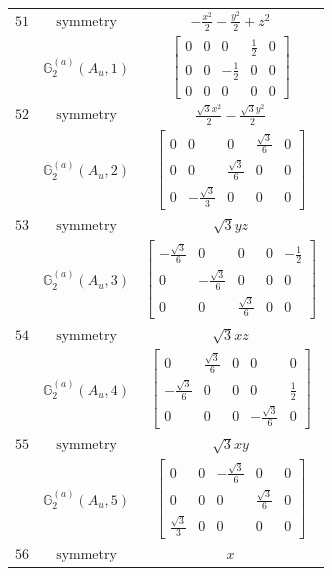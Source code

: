 \documentclass[fleqn,8pt,landscape]{jsarticle}
\begin{document}
\begin{longtable}{ccc}
$ 51 $ & $ \text{symmetry} $ & $ - \frac{x^{2}}{2} - \frac{y^{2}}{2} + z^{2} $ \\
$  $ & $ \mathbb{G}_{2}^{(a)}(A_{u},1) $ & $ \begin{bmatrix} 0 & 0 & 0 & \frac{1}{2} & 0 \\ 0 & 0 & - \frac{1}{2} & 0 & 0 \\ 0 & 0 & 0 & 0 & 0 \end{bmatrix} $ \\ \hline
$ 52 $ & $ \text{symmetry} $ & $ \frac{\sqrt{3} x^{2}}{2} - \frac{\sqrt{3} y^{2}}{2} $ \\
$  $ & $ \mathbb{G}_{2}^{(a)}(A_{u},2) $ & $ \begin{bmatrix} 0 & 0 & 0 & \frac{\sqrt{3}}{6} & 0 \\ 0 & 0 & \frac{\sqrt{3}}{6} & 0 & 0 \\ 0 & - \frac{\sqrt{3}}{3} & 0 & 0 & 0 \end{bmatrix} $ \\ \hline
$ 53 $ & $ \text{symmetry} $ & $ \sqrt{3} y z $ \\
$  $ & $ \mathbb{G}_{2}^{(a)}(A_{u},3) $ & $ \begin{bmatrix} - \frac{\sqrt{3}}{6} & 0 & 0 & 0 & - \frac{1}{2} \\ 0 & - \frac{\sqrt{3}}{6} & 0 & 0 & 0 \\ 0 & 0 & \frac{\sqrt{3}}{6} & 0 & 0 \end{bmatrix} $ \\ \hline
$ 54 $ & $ \text{symmetry} $ & $ \sqrt{3} x z $ \\
$  $ & $ \mathbb{G}_{2}^{(a)}(A_{u},4) $ & $ \begin{bmatrix} 0 & \frac{\sqrt{3}}{6} & 0 & 0 & 0 \\ - \frac{\sqrt{3}}{6} & 0 & 0 & 0 & \frac{1}{2} \\ 0 & 0 & 0 & - \frac{\sqrt{3}}{6} & 0 \end{bmatrix} $ \\ \hline
$ 55 $ & $ \text{symmetry} $ & $ \sqrt{3} x y $ \\
$  $ & $ \mathbb{G}_{2}^{(a)}(A_{u},5) $ & $ \begin{bmatrix} 0 & 0 & - \frac{\sqrt{3}}{6} & 0 & 0 \\ 0 & 0 & 0 & \frac{\sqrt{3}}{6} & 0 \\ \frac{\sqrt{3}}{3} & 0 & 0 & 0 & 0 \end{bmatrix} $ \\ \hline
$ 56 $ & $ \text{symmetry} $ & $ x $ \\

\end{longtable}
\end{document}
